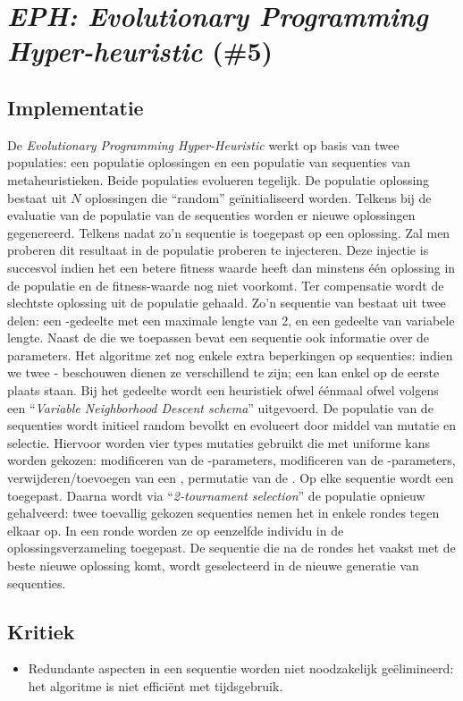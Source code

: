 \section{\emph{EPH: Evolutionary Programming Hyper-heuristic} (\#5)}
\label{sss:eph}
\subsection{Implementatie}
De \emph{Evolutionary Programming Hyper-Heuristic}\cite{chesc-eph} werkt op basis van twee populaties: een populatie oplossingen en een populatie van sequenties van metaheuristieken. Beide populaties evolueren tegelijk. De populatie oplossing bestaat uit $N$ oplossingen die ``random'' ge\"initialiseerd worden. Telkens bij de evaluatie van de populatie van de sequenties worden er nieuwe oplossingen gegenereerd. Telkens nadat zo'n sequentie is toegepast op een oplossing. Zal men proberen dit resultaat in de populatie proberen te injecteren. Deze injectie is succesvol indien het een betere fitness waarde heeft dan minstens \'e\'en oplossing in de populatie en de fitness-waarde nog niet voorkomt. Ter compensatie wordt de slechtste oplossing uit de populatie gehaald. Zo'n sequentie van \abllhn{} bestaat uit twee delen: een \abpt{}-gedeelte met een maximale lengte van 2, en een \abls{} gedeelte van variabele lengte. Naast de \abllhn{} die we toepassen bevat een sequentie ook informatie over de parameters. Het algoritme zet nog enkele extra beperkingen op sequenties: indien we twee \abpt{}-\abhn{} beschouwen dienen ze verschillend te zijn; een \abpt{} \abh{} kan enkel op de eerste plaats staan. Bij het \abls{} gedeelte wordt een heuristiek ofwel \'e\'enmaal ofwel volgens een ``\emph{Variable Neighborhood Descent schema}''\cite{hom/vns} uitgevoerd. De populatie van de sequenties wordt initieel random bevolkt en evolueert door middel van mutatie en selectie. Hiervoor worden vier types mutaties gebruikt die met uniforme kans worden gekozen: modificeren van de \abpt{}-parameters, modificeren van de \abls{}-parameters, verwijderen/toevoegen van een \abpt{}, permutatie van de \abls{} \abhn{}. Op elke sequentie wordt een \abmt{} toegepast. Daarna wordt via ``\emph{2-tournament selection}''\cite{Miller95geneticalgorithms} de populatie opnieuw gehalveerd: twee toevallig gekozen sequenties nemen het in enkele rondes tegen elkaar op. In een ronde worden ze op eenzelfde individu in de oplossingsverzameling toegepast. De sequentie die na de rondes het vaakst met de beste nieuwe oplossing komt, wordt geselecteerd in de nieuwe generatie van sequenties.
\subsection{Kritiek}
\begin{itemize}
 \item Redundante aspecten in een sequentie worden niet noodzakelijk ge\"elimineerd: het algoritme is niet effici\"ent met tijdsgebruik.
\end{itemize}